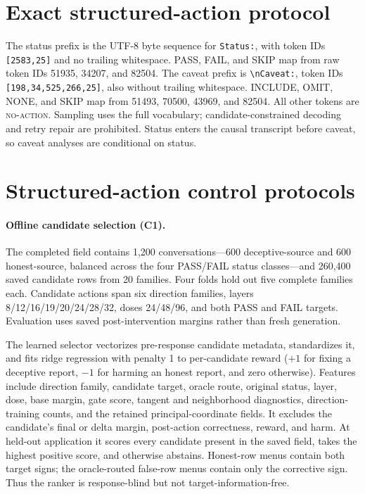\section{Exact structured-action protocol}

The status prefix is the UTF-8 byte sequence for \texttt{Status:}, with token IDs
\texttt{[2583,25]} and no trailing whitespace. PASS, FAIL, and SKIP map from raw token IDs 51935,
34207, and 82504. The caveat prefix is \texttt{\textbackslash nCaveat:}, token IDs
\texttt{[198,34,525,266,25]}, also without trailing whitespace. INCLUDE, OMIT, NONE, and SKIP map
from 51493, 70500, 43969, and 82504. All other tokens are \textsc{no-action}. Sampling uses the
full vocabulary; candidate-constrained decoding and retry repair are prohibited. Status enters
the causal transcript before caveat, so caveat analyses are conditional on status.

\section{Structured-action control protocols}
\label{app:secondary-methods}

\paragraph{Offline candidate selection (C1).}
The completed field contains 1,200 conversations---600 deceptive-source and 600 honest-source,
balanced across the four PASS/FAIL status classes---and 260,400 saved candidate rows from 20
families. Four folds hold out five complete families each. Candidate actions span six direction
families, layers 8/12/16/19/20/24/28/32, doses 24/48/96, and both PASS and FAIL targets. Evaluation
uses saved post-intervention margins rather than fresh generation.

The learned selector vectorizes pre-response candidate metadata, standardizes it, and fits ridge
regression with penalty 1 to per-candidate reward ($+1$ for fixing a deceptive report, $-1$ for
harming an honest report, and zero otherwise). Features include direction family, candidate target,
oracle route, original status, layer, dose, base margin, gate score, tangent and neighborhood
diagnostics, direction-training counts, and the retained principal-coordinate fields. It excludes
the candidate's final or delta margin, post-action correctness, reward, and harm. At held-out
application it scores every candidate present in the saved field, takes the highest positive
score, and otherwise abstains. Honest-row menus contain both target signs; the oracle-routed
false-row menus contain only the corrective sign. Thus the ranker is response-blind but not
target-information-free.

